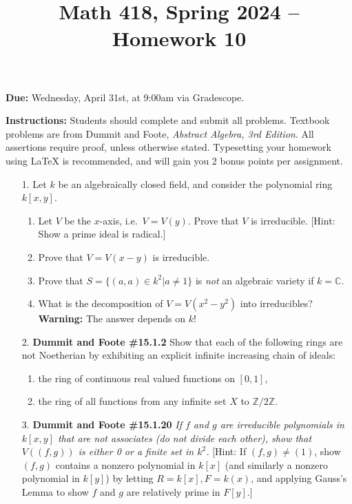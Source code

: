 \documentclass[12pt]{article}
\title{Math 418, Spring 2024 -- Homework 10}
\date{}
\newcommand{\Z}{\mathbb{Z}}
\newcommand{\C}{\mathbb{C}}
\begin{document}
 \maketitle
\vspace{-80pt}

\textbf{Due:} Wednesday, April 31st, at 9:00am via Gradescope.

\textbf{Instructions:} Students should complete and submit all problems. Textbook problems are from Dummit and Foote, \emph{Abstract Algebra, 3rd Edition}. All assertions require proof, unless otherwise stated. Typesetting your homework using LaTeX is recommended, and will gain you 2 bonus points per assignment.

\begin{enumerate}

\item[1.] Let $k$ be an algebraically closed field, and consider the polynomial ring $k[x,y]$.  
  \begin{enumerate}
  \item Let $V$ be the $x$-axis, i.e.~$V = V(y)$. Prove that $V$ is irreducible. [Hint: Show a prime ideal is radical.]
  \item Prove that $V = V(x - y)$ is irreducible. 
  \item Prove that $S = \{(a,a) \in k^2 |a \neq 1\}$ is \emph{not} an algebraic variety if $k = \C$.
  \item What is the decomposition of $V = V(x^2 - y^2)$ into irreducibles?  \textbf{Warning:} The answer depends on $k$!
  \end{enumerate}

\item[2.] \textbf{Dummit and Foote \#15.1.2} Show that each of the following rings are not Noetherian by exhibiting an explicit infinite increasing chain of ideals:

\begin{enumerate}
\item the ring of continuous real valued functions on $[0, 1]$,
\item the ring of all functions from any infinite set $X$ to $\Z/2\Z$.
\end{enumerate}

\item[3.] \textbf{Dummit and Foote \#15.1.20} \textit{If $f$ and $g$ are irreducible polynomials in $k[x, y]$ that are not associates (do not divide each other), show that $V((f, g))$ is either 0 or a finite set in $k^2$.} [Hint: If $(f, g) \ne (1)$, show $(f, g)$ contains a nonzero polynomial in $k[x]$ (and similarly a nonzero polynomial in $k[y]$) by letting $R = k[x], F = k(x)$, and applying Gauss's Lemma to show $f$ and $g$ are relatively prime in $F[y]$.]


\end{enumerate}
\end{document}
